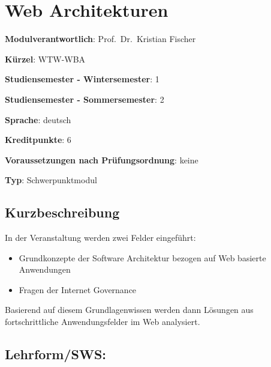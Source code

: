 \chapter{Web Architekturen}\label{web-architekturen}

\begin{modulHead}
\textbf{Modulverantwortlich}: Prof.~Dr.~Kristian
Fischer
\end{modulHead}
\begin{modulHead}
\textbf{Kürzel}:
WTW-WBA
\end{modulHead}
\begin{modulHead}
\textbf{Studiensemester -
Wintersemester}:
1
\end{modulHead}
\begin{modulHead}
\textbf{Studiensemester -
Sommersemester}: 2
\end{modulHead}
\begin{modulHead}
\textbf{Sprache}:
deutsch
\end{modulHead}
\begin{modulHead}
\textbf{Kreditpunkte}:
6
\end{modulHead}
\begin{modulHead}
\textbf{Voraussetzungen nach
Prüfungsordnung}: keine
\end{modulHead}
\begin{modulHead}
\textbf{Typ}:
Schwerpunktmodul
\end{modulHead}


\section*{Kurzbeschreibung}\label{kurzbeschreibung-18}

In der Veranstaltung werden zwei Felder eingeführt:

\begin{itemize}
\tightlist
\item
  Grundkonzepte der Software Architektur bezogen auf Web basierte
  Anwendungen
\item
  Fragen der Internet Governance
\end{itemize}

Basierend auf diesem Grundlagenwissen werden dann Lösungen aus
fortschrittliche Anwendungsfelder im Web analysiert.

\section*{Lehrform/SWS:}\label{lehrformsws-23}

